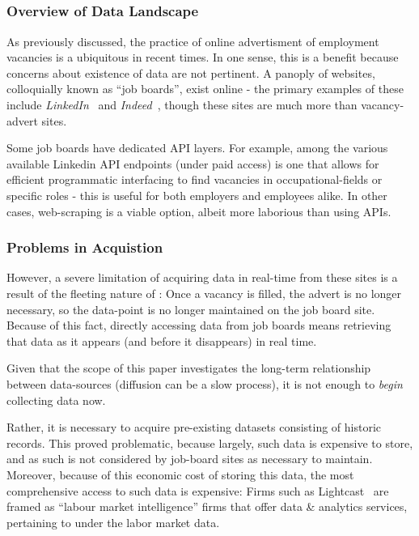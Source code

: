 \subsection{\jobposts{}}

\subsubsection{Overview of Data Landscape}
As previously discussed, the practice of online advertisment of employment vacancies is a ubiquitous in recent times.
In one sense, this is a benefit because concerns about existence of data are not pertinent.
A panoply of websites, colloquially known as ``job boards'', exist online - the primary examples of these include \emph{LinkedIn}~\cite{linkedin_website} and \emph{Indeed}~\cite{indeed_website}, though these sites are much more than vacancy-advert sites.

Some job boards have dedicated API layers.
For example, among the various available Linkedin API endpoints (under paid access) is one that allows for efficient programmatic interfacing to find vacancies in occupational-fields or specific roles - this is useful for both employers and employees alike.
In other cases, web-scraping is a viable option, albeit more laborious than using APIs.
\subsubsection{Problems in Acquistion}
However, a severe limitation of acquiring data in real-time from these sites is a result of the fleeting nature of \jobposts{}: Once a vacancy is filled, the advert is no longer necessary, so the data-point is no longer maintained on the job board site.
Because of this fact, directly accessing \jobpost{} data from job boards means retrieving that data as it appears (and before it disappears) in real time.

Given that the scope of this paper investigates the long-term relationship between data-sources (diffusion can be a slow process), it is not enough to \emph{begin} collecting data now.

Rather, it is necessary to acquire pre-existing datasets consisting of historic records. This proved problematic, because largely, such data is expensive to store, and as such is not considered by job-board sites as necessary to maintain.
Moreover, because of this economic cost of storing this data, the most comprehensive access to such data is expensive: Firms such as Lightcast~\cite{lightcast__LightcastGlobal} are framed as ``labour market intelligence'' firms that offer data \& analytics services, pertaining to \jobposts{} under the labor market data.

